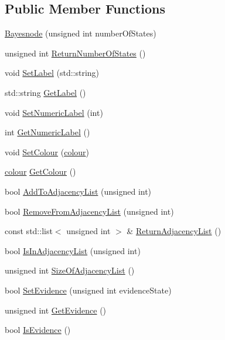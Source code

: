 \subsection*{Public Member Functions}
\begin{DoxyCompactItemize}
\item 
\hyperlink{classbayonet_1_1_bayesnode_a2b676188453fbbb4dc96be714ac931d3}{Bayesnode} (unsigned int number\-Of\-States)
\item 
unsigned int \hyperlink{classbayonet_1_1_bayesnode_a24d38b28413a60938ea7fad7c74e823d}{Return\-Number\-Of\-States} ()
\item 
void \hyperlink{classbayonet_1_1_bayesnode_abaa27f1597d5599344e3a4d82e7b64b0}{Set\-Label} (std\-::string)
\item 
std\-::string \hyperlink{classbayonet_1_1_bayesnode_aebe7f411efe8b8647ed6f7d28f700638}{Get\-Label} ()
\item 
void \hyperlink{classbayonet_1_1_bayesnode_adbda396fa53b6923a69824c98fce9ca1}{Set\-Numeric\-Label} (int)
\item 
int \hyperlink{classbayonet_1_1_bayesnode_a347df4c4cac0f04f6b263a3523ea37d5}{Get\-Numeric\-Label} ()
\item 
void \hyperlink{classbayonet_1_1_bayesnode_a1102ecda4b933a2ccce879ca520a795e}{Set\-Colour} (\hyperlink{classbayonet_1_1_bayesnode_a6294bd0f5387871bc5f39f57cc1f0fb3}{colour})
\item 
\hyperlink{classbayonet_1_1_bayesnode_a6294bd0f5387871bc5f39f57cc1f0fb3}{colour} \hyperlink{classbayonet_1_1_bayesnode_a9f4a34547a9dab484a683450cd68691c}{Get\-Colour} ()
\item 
bool \hyperlink{classbayonet_1_1_bayesnode_ab3c6995309d67dd9b30c645fbb1cb739}{Add\-To\-Adjacency\-List} (unsigned int)
\item 
bool \hyperlink{classbayonet_1_1_bayesnode_a96768ee5d89848d3275c7d916faad480}{Remove\-From\-Adjacency\-List} (unsigned int)
\item 
const std\-::list$<$ unsigned int $>$ \& \hyperlink{classbayonet_1_1_bayesnode_ad20de796507c48523bcf49fffdc7b3d5}{Return\-Adjacency\-List} ()
\item 
bool \hyperlink{classbayonet_1_1_bayesnode_a531f3d3341170ba4ea6d646f1a368b54}{Is\-In\-Adjacency\-List} (unsigned int)
\item 
unsigned int \hyperlink{classbayonet_1_1_bayesnode_a33a92e17091b3d0361d63eeadbbd39b6}{Size\-Of\-Adjacency\-List} ()
\item 
bool \hyperlink{classbayonet_1_1_bayesnode_ac2cb3576c583115b45dbf331727d9fff}{Set\-Evidence} (unsigned int evidence\-State)
\item 
unsigned int \hyperlink{classbayonet_1_1_bayesnode_a783735e7bb2ec04a07a209a8c83f95cd}{Get\-Evidence} ()
\item 
bool \hyperlink{classbayonet_1_1_bayesnode_a71a90c0403ecb1441d43af3978200fd2}{Is\-Evidence} ()
\end{DoxyCompactItemize}
